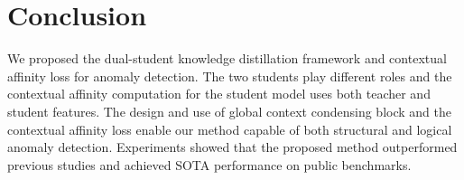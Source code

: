 \documentclass[10pt,twocolumn,letterpaper]{article}
\begin{document}
\section{Conclusion}
We proposed the dual-student knowledge distillation framework and contextual affinity loss for anomaly detection. The two students play different roles and the contextual affinity computation for the student model uses both teacher and student features. The design and use of global context condensing block  and the contextual affinity loss enable our method capable of both structural and logical anomaly detection. Experiments showed that the proposed method outperformed previous studies and achieved SOTA performance on public benchmarks.


{\small


}
\end{document}
